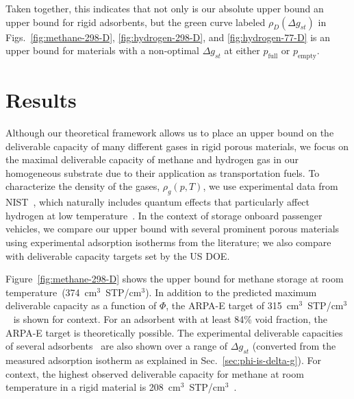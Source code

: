 \documentclass[twoside,twocolumn,9pt]{article}
\newcommand\V{\Phi}
\newcommand\pfull{\ensuremath{p_{\text{full}}}}
\newcommand\pempty{\ensuremath{p_{\text{empty}}}}
\newcommand\gst{\ensuremath{\Delta g_{st}}}
\begin{document}
Taken together, this indicates that not only is our absolute upper bound an
upper bound for rigid adsorbents, but the green curve labeled $\rho_D(\gst)$ in
Figs.~\ref{fig:methane-298-D}, \ref{fig:hydrogen-298-D}, and
\ref{fig:hydrogen-77-D} is an upper bound for materials with a non-optimal
$\gst$ at either $\pfull$ or $\pempty$.


\section{Results}
Although our theoretical framework allows us to place an upper bound on the
deliverable capacity of many different gases in rigid porous materials, we
focus on the maximal deliverable capacity of methane and hydrogen gas in our
homogeneous substrate due to their application as transportation fuels. To
characterize the density of the gases, $\rho_g(p, T)$, we use experimental data
from NIST~\cite{nist}, which naturally includes quantum effects that
particularly affect hydrogen at low temperature~\cite{kumar2006quantum}. In the
context of storage onboard passenger vehicles, we compare our upper bound with
several prominent porous materials using experimental adsorption isotherms from
the literature; we also compare with deliverable capacity targets set by the US
DOE.

Figure~\ref{fig:methane-298-D} shows the upper bound for methane storage at
room temperature~(374~cm$^3$~STP/cm$^3$). In addition to the predicted maximum
deliverable capacity as a function of $\V$, the ARPA-E target of
315~cm$^3$~STP/cm$^3$~\cite{arpaemove} is shown for context. For an adsorbent
with at least 84\% void fraction, the ARPA-E target is theoretically possible.
The experimental deliverable capacities of several
adsorbents~\cite{mason2014evaluating} are also shown over a range of $\gst$
(converted from the measured adsorption isotherm as explained in
Sec.~\ref{sec:phi-is-delta-g}). For context, the highest observed
deliverable capacity for methane at room temperature in a rigid material is 208~cm$^3$~STP/cm$^3$~\cite{simon2015materials}.
\end{document}
